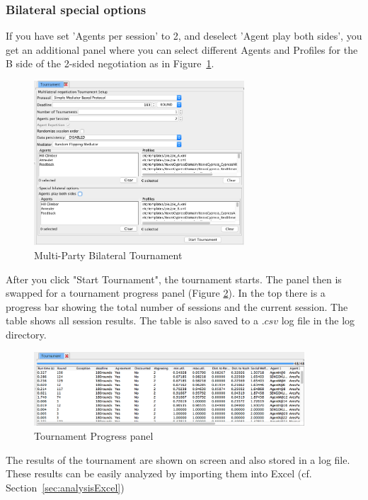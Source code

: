 \documentclass[]{article}
\begin{document}
\subsubsection{Bilateral special options}
If you have set 'Agents per session' to 2, and deselect 'Agent play both sides', you get an additional panel where you can select different Agents and Profiles for the B side of the 2-sided negotiation as in Figure~\ref{Fig:multipartytournament2}. 

\begin{figure}[htb]
	\centering
	\includegraphics[width=0.7\textwidth]{media/multipartytournament2.png}
\caption{Multi-Party Bilateral Tournament}\label{Fig:multipartytournament2}
\end{figure}

After you click "Start Tournament", the tournament starts. The panel then is swapped for a tournament progress panel (Figure \ref{Fig:tournamentprogress}). 
In the top there is a progress bar showing the total number of sessions and the current session. The table shows all session results. The table is also saved to a $.csv$ log file in the log directory.

\begin{figure}[htb]
	\centering
	\includegraphics[width=0.9\textwidth]{media/tournamentprogress.png}
\caption{Tournament Progress panel}\label{Fig:tournamentprogress}
\end{figure}

The results of the tournament are shown on screen and also stored in a log file.  These results can be easily analyzed by importing them into Excel (cf. Section~\ref{sec:analysisExcel})
\end{document}
